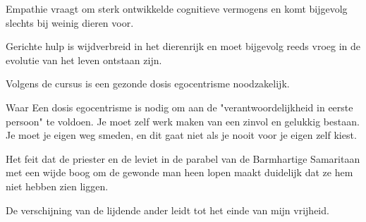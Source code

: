 \documentclass[main.tex]{subfiles}
\begin{document}
\begin{examenvraag}
    \begin{stelling}
        Empathie vraagt om sterk ontwikkelde cognitieve vermogens en komt bijgevolg slechts bij weinig dieren voor.
    \end{stelling}

    \begin{antwoord}
    \end{antwoord}
\end{examenvraag}


\begin{examenvraag}
    \begin{stelling}
        Gerichte hulp is wijdverbreid in het dierenrijk en moet bijgevolg reeds vroeg in de evolutie van het leven ontstaan zijn.
    \end{stelling}

    \begin{antwoord}
    \end{antwoord}
\end{examenvraag}


\begin{examenvraag}
    \begin{stelling}
        Volgens de cursus is een gezonde dosis egocentrisme noodzakelijk.
    \end{stelling}

	 \begin{stelling-antwoord}{Waar}
        Een dosis egocentrisme is nodig om aan de "verantwoordelijkheid in eerste persoon" te voldoen. 
        Je moet zelf werk maken van een zinvol en gelukkig bestaan. 
        Je moet je eigen weg smeden, en dit gaat niet als je nooit voor je eigen zelf kiest.
    \end{stelling-antwoord}
\end{examenvraag}


\begin{examenvraag}
    \begin{stelling}
        Het feit dat de priester en de leviet in de parabel van de Barmhartige Samaritaan met een wijde boog om de gewonde man heen lopen maakt duidelijk dat ze hem niet hebben zien liggen.
    \end{stelling}


\end{examenvraag}


\begin{examenvraag}
    \begin{stelling}
        De verschijning van de lijdende ander leidt tot het einde van mijn vrijheid.
    \end{stelling}

    \begin{antwoord}
    \end{antwoord}
\end{examenvraag}
\end{document}
